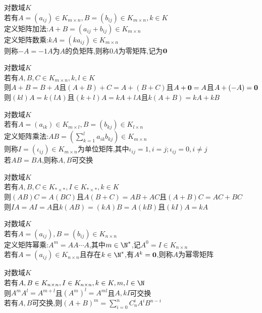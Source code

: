 \begin{dingyi}
对数域$K$\\
若有$A=(a_{ij})\in K_{m\times n},B=(b_{ij})\in K_{m\times n},k\in K$\\
定义矩阵加法:$A+B=(a_{ij}+b_{ij})\in K_{m\times n}$\\
定义矩阵数乘:$kA=(ka_{ij})\in K_{m\times n}$\\
则称$-A=-1A$为$A$的负矩阵,则称$0A$为零矩阵,记为$\bf0$
\end{dingyi}

\begin{dingli}
对数域$K$\\
若有$A,B,C\in K_{m\times n},k,l\in K$\\
则$A+B=B+A$且$(A+B)+C=A+(B+C)$且$A+{\bf0}=A$且$A+(-A)={\bf0}$\\
则$(kl)A=k(lA)$且$(k+l)A=kA+lA$且$k(A+B)=kA+kB$
\end{dingli}

\begin{dingyi}
对数域$K$\\
若有$A=(a_{ik})\in K_{m\times l},B=(b_{kj})\in K_{l\times n}$\\
定义矩阵乘法:$AB=(\sum\limits_{k=1}^{l}a_{ik}b_{kj})\in K_{m\times n}$\\
则称$I=(\iota_{ij})\in K_{m\times n}$为单位矩阵,其中$\iota_{ij}=1,i=j ;\iota_{ij}=0,i\neq j$\\
若$AB=BA$,则称$A,B$可交换
\end{dingyi}

\begin{dingli}
对数域$K$\\
若有$A,B,C\in K_{*\times *},I\in K_{*\times *},k\in K$\\
则$(AB)C=A(BC)$且$A(B+C)=AB+AC$且$(A+B)C=AC+BC$\\
则$IA=AI=A$且$k(AB)=(kA)B=A(kB)$且$(kI)A=kA$
\end{dingli}

\begin{dingyi}
对数域$K$\\
若有$A=(a_{ij}),B=(b_{ij})\in K_{n\times n}$\\
定义矩阵幂乘:$A^{m}=AA\cdots A$,其中$m\in \N^*$,记$A^{0}=I\in K_{n\times n}$\\
若有$A=(a_{ij})\in K_{n\times n}$且存在$k\in \N^*$,有$A^k={\bf0}$,则称$A$为幂零矩阵
\end{dingyi}

\begin{dingli}
对数域$K$\\
若有$A,B\in K_{n\times n},I\in K_{n\times n},k\in K,m,l\in \N$\\
则$A^{m}A^{l}=A^{m+l}$且$(A^{m})^{l}=A^{ml}$且$A,kI$可交换\\
若有$A,B$可交换,则$(A+B)^{m}=\sum\limits_{i=0}^{n}C_{n}^{i}A^{i}B^{n-i}$
\end{dingli}

